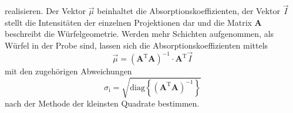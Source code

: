 realisieren.
Der Vektor $\vec{\mu}$ beinhaltet die
Absorptionskoeffizienten,
der Vektor $\vec{I}$ stellt die Intensitäten der einzelnen Projektionen dar
und die Matrix $\mathbf{A}$ beschreibt die Würfelgeometrie.
Werden mehr Schichten aufgenommen, als Würfel in der Probe sind, lassen sich
die Absorptionskoeffizienten mittels
\begin{equation}
  \vec{\mu} = \left(\mathbf{A}^\text{T} \mathbf{A}\right)^{-1} \cdot
  \mathbf{A}^\text{T} \vec{I}
  \label{eqn:least-squares}
\end{equation}
mit den zugehörigen Abweichungen
\begin{equation}
  \sigma_\text{i} =
  \sqrt{\text{diag}\left\{\left(\mathbf{A}^\text{T} \mathbf{A}\right)^{-1}\right\}}
  \label{eqn:least-squares-error}
\end{equation}
nach der Methode der kleinsten Quadrate bestimmen.
